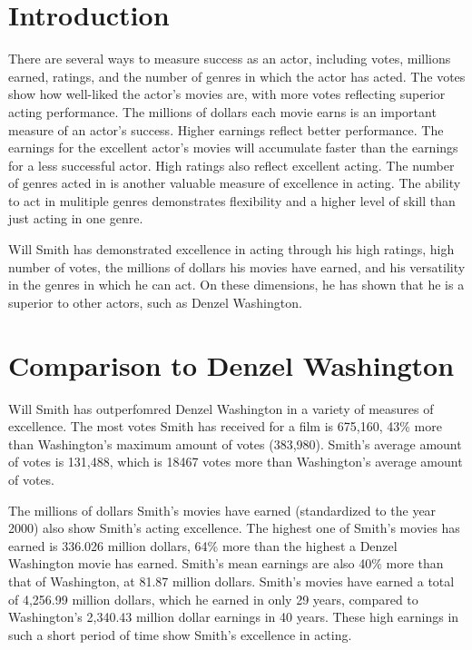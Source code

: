 \documentclass[]{article}
\begin{document}
\section{Introduction}
\label{sec:intro}

\doublespacing

There are several ways to measure success as an actor, including votes,
millions earned, ratings, and the number of genres in which the actor
has acted. The votes show how well-liked the actor's movies are, with
more votes reflecting superior acting performance. The millions of
dollars each movie earns is an important measure of an actor's success.
Higher earnings reflect better performance. The earnings for the
excellent actor's movies will accumulate faster than the earnings for a
less successful actor. High ratings also reflect excellent acting. The
number of genres acted in is another valuable measure of excellence in
acting. The ability to act in mulitiple genres demonstrates flexibility
and a higher level of skill than just acting in one genre.

Will Smith has demonstrated excellence in acting through his high
ratings, high number of votes, the millions of dollars his movies have
earned, and his versatility in the genres in which he can act. On these
dimensions, he has shown that he is a superior to other actors, such as
Denzel Washington.

\newpage
\section{ Comparison to Denzel Washington}
\label{sec:da}

Will Smith has outperfomred Denzel Washington in a variety of measures
of excellence. The most votes Smith has received for a film is 675,160,
43\% more than Washington's maximum amount of votes (383,980). Smith's
average amount of votes is 131,488, which is 18467 votes more than
Washington's average amount of votes.

The millions of dollars Smith's movies have earned (standardized to the
year 2000) also show Smith's acting excellence. The highest one of
Smith's movies has earned is 336.026 million dollars, 64\% more than the
highest a Denzel Washington movie has earned. Smith's mean earnings are
also 40\% more than that of Washington, at 81.87 million dollars.
Smith's movies have earned a total of 4,256.99 million dollars, which he
earned in only 29 years, compared to Washington's 2,340.43 million
dollar earnings in 40 years. These high earnings in such a short period
of time show Smith's excellence in acting.
\end{document}
